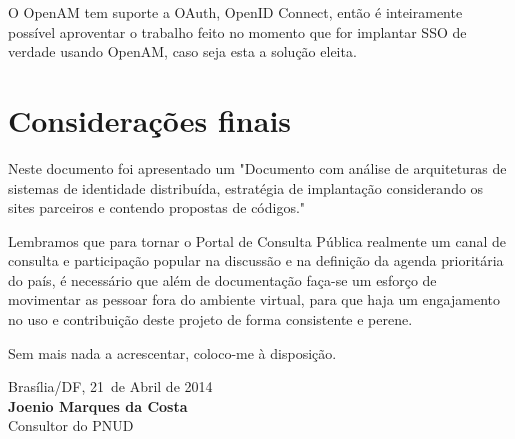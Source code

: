 \documentclass[11pt]{article}
\newcommand{\MyName}{Joenio Marques da Costa}
\newcommand{\ProductDescription}{"Documento com análise de arquiteturas de
        sistemas de identidade distribuída, estratégia de implantação
        considerando os sites parceiros e contendo propostas de códigos."
}
\newcommand{\MesEntrega}{Abril de 2014}
\newcommand{\DiaEntrega}{21}
\begin{document}
O OpenAM tem suporte a OAuth, OpenID Connect, então é inteiramente possível
aproventar o trabalho feito no momento que for implantar SSO de verdade usando
OpenAM, caso seja esta a solução eleita.

\section{Considerações finais}

Neste documento foi apresentado um \ProductDescription

Lembramos que para tornar o Portal de Consulta Pública realmente um canal de
consulta e participação popular na discussão e na definição da agenda
prioritária do país, é necessário que além de documentação faça-se um esforço
de movimentar as pessoar fora do ambiente virtual, para que haja um
engajamento no uso e contribuição deste projeto de forma consistente e perene.

\vspace{1cm}

Sem mais nada a acrescentar, coloco-me à disposição.

\vspace{1cm}

\begin{minipage}{\textwidth}
  Brasília/DF, \DiaEntrega \ de \MesEntrega\\[1cm]
  \textbf{\MyName}\\
  \small Consultor do PNUD
\end{minipage}
\end{document}
